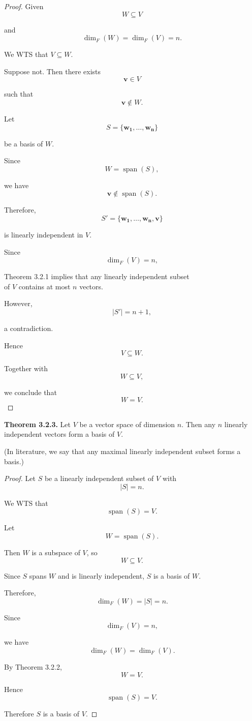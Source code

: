 \documentclass[12pt]{article}
\begin{document}
\begin{proof}
Given
\[
W\subseteq V
\]

and
\[
\dim_F(W)=\dim_F(V)=n.
\]

We WTS that $V\subseteq W$.

Suppose not. Then there exists
\[
\mathbf{v}\in V
\]

such that
\[
\mathbf{v}\notin W.
\]

Let
\[
S=\{\mathbf{w_1,\ldots,w_n}\}
\]

be a basis of $W$.

Since
\[
W=\operatorname{span}(S),
\]

we have
\[
\mathbf{v}\notin\operatorname{span}(S).
\]

Therefore,
\[
S'=\{\mathbf{w_1,\ldots,w_n,v}\}
\]

is linearly independent in $V$.

Since
\[
\dim_F(V)=n,
\]

Theorem 3.2.1 implies that any linearly independent subset\\
of $V$ contains at most $n$ vectors.

However,
\[
|S'|=n+1,
\]

a contradiction.

Hence
\[
V\subseteq W.
\]

Together with
\[
W\subseteq V,
\]

we conclude that
\[
W=V.
\]
\end{proof}

\textbf{Theorem 3.2.3.}
Let $V$ be a vector space of dimension $n$. Then any $n$ linearly independent vectors form a basis of $V$.

(In literature, we say that any maximal linearly independent subset forms a basis.)

\begin{proof}
Let $S$ be a linearly independent subset of $V$ with
\[
|S|=n.
\]

We WTS that
\[
\operatorname{span}(S)=V.
\]

Let
\[
W=\operatorname{span}(S).
\]

Then $W$ is a subspace of $V$, so
\[
W\subseteq V.
\]

Since $S$ spans $W$ and is linearly independent, $S$ is a basis of $W$.

Therefore,
\[
\dim_F(W)=|S|=n.
\]

Since
\[
\dim_F(V)=n,
\]

we have
\[
\dim_F(W)=\dim_F(V).
\]

By Theorem 3.2.2,
\[
W=V.
\]

Hence
\[
\operatorname{span}(S)=V.
\]

Therefore $S$ is a basis of $V$.

\end{proof}
\end{document}
